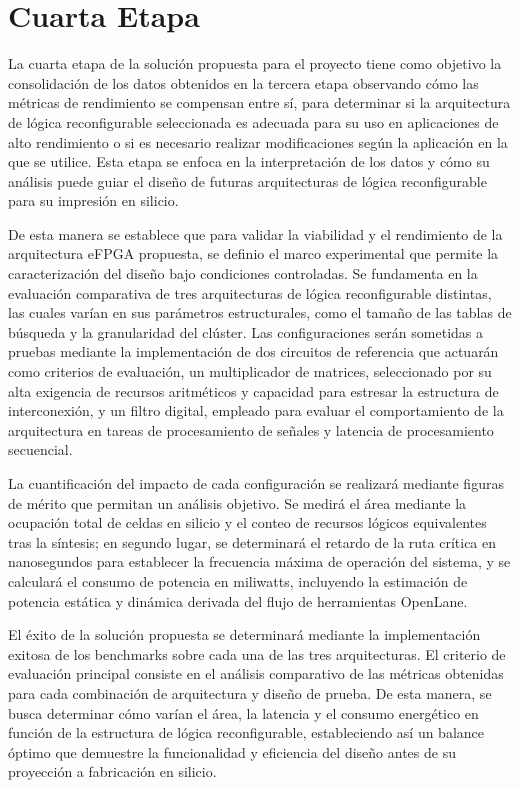 \section{Cuarta Etapa}

La cuarta etapa de la solución propuesta para el proyecto tiene como objetivo la consolidación 
de los datos obtenidos en la tercera etapa observando cómo las métricas de rendimiento se 
compensan entre sí, para determinar si la arquitectura de lógica reconfigurable seleccionada 
es adecuada para su uso en aplicaciones de alto rendimiento o si es necesario realizar 
modificaciones según la aplicación en la que se utilice. Esta etapa se enfoca en la 
interpretación de los datos y cómo su análisis puede guiar el diseño de futuras arquitecturas 
de lógica reconfigurable para su impresión en silicio.

De esta manera se establece que para validar la viabilidad y el rendimiento de la arquitectura 
eFPGA propuesta, se definio el marco experimental que permite la caracterización del diseño bajo 
condiciones controladas. Se fundamenta en la evaluación comparativa de tres arquitecturas de 
lógica reconfigurable distintas, las cuales varían en sus parámetros estructurales, como el 
tamaño de las tablas de búsqueda y la granularidad del clúster. Las configuraciones serán 
sometidas a pruebas mediante la implementación de dos circuitos de referencia que actuarán 
como criterios de evaluación, un multiplicador de matrices, seleccionado por su alta 
exigencia de recursos aritméticos y capacidad para estresar la estructura de interconexión, 
y un filtro digital, empleado para evaluar el comportamiento de la arquitectura en tareas de 
procesamiento de señales y latencia de procesamiento secuencial.

La cuantificación del impacto de cada configuración se realizará mediante figuras de mérito 
que permitan un análisis objetivo. Se medirá el área mediante la ocupación total de celdas en 
silicio y el conteo de recursos lógicos equivalentes tras la síntesis; en segundo lugar, se 
determinará el retardo de la ruta crítica en nanosegundos para establecer la frecuencia 
máxima de operación del sistema, y se calculará el consumo de potencia en miliwatts, 
incluyendo la estimación de potencia estática y dinámica derivada del flujo de herramientas 
OpenLane.

El éxito de la solución propuesta se determinará mediante la implementación exitosa de los 
benchmarks sobre cada una de las tres arquitecturas. El criterio de evaluación principal 
consiste en el análisis comparativo de las métricas obtenidas para cada combinación de 
arquitectura y diseño de prueba. De esta manera, se busca determinar cómo varían el área, la 
latencia y el consumo energético en función de la estructura de lógica reconfigurable, 
estableciendo así un balance óptimo que demuestre la funcionalidad y eficiencia del diseño 
antes de su proyección a fabricación en silicio.


